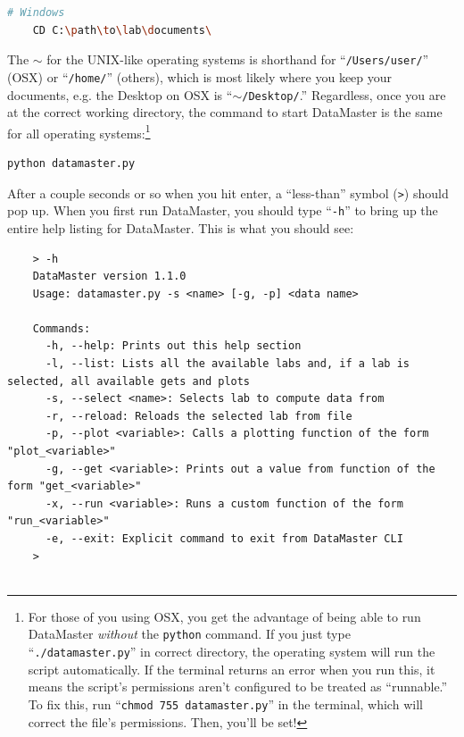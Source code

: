 \documentclass[12pt]{article}
\begin{document}
{\begin{framed}
\begin{lstlisting}[language=sh]
    # Windows
    CD C:\path\to\lab\documents\
  \end{lstlisting}
\end{framed}
The $\sim$ for the UNIX-like operating systems is shorthand for ``\texttt{/Users/user/}'' (OSX) or ``\texttt{/home/}'' (others), which is most likely where you keep your documents, e.g. the Desktop on OSX is ``\texttt{$\sim$/Desktop/}.'' Regardless, once you are at the correct working directory, the command to start DataMaster is the same for all operating systems:\footnote{\textsf{For those of you using OSX, you get the advantage of being able to run DataMaster \textit{without} the \texttt{python} command. If you just type ``\texttt{./datamaster.py}'' in correct directory, the operating system will run the script automatically. If the terminal returns an error when you run this, it means the script's permissions aren't configured to be treated as ``runnable.'' To fix this, run ``\texttt{chmod 755 datamaster.py}'' in the terminal, which will correct the file's permissions. Then, you'll be set!}}
\begin{framed}
  \begin{lstlisting}[language=sh]
    python datamaster.py
  \end{lstlisting}
\end{framed}
After a couple seconds or so when you hit enter, a ``less-than'' symbol (\texttt{>}) should pop up. When you first run DataMaster, you should type ``\texttt{-h}'' to bring up the entire help listing for DataMaster. This is what you should see:
\begin{framed}
  \begin{lstlisting}
    > -h
    DataMaster version 1.1.0
    Usage: datamaster.py -s <name> [-g, -p] <data name>
    
    Commands:
      -h, --help: Prints out this help section
      -l, --list: Lists all the available labs and, if a lab is selected, all available gets and plots
      -s, --select <name>: Selects lab to compute data from
      -r, --reload: Reloads the selected lab from file
      -p, --plot <variable>: Calls a plotting function of the form "plot_<variable>"
      -g, --get <variable>: Prints out a value from function of the form "get_<variable>"
      -x, --run <variable>: Runs a custom function of the form "run_<variable>"
      -e, --exit: Explicit command to exit from DataMaster CLI
    > 


\end{lstlisting}
\end{framed}}
\end{document}
